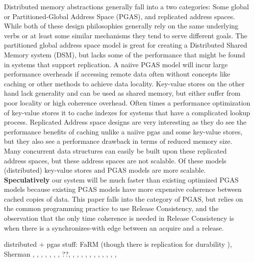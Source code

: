 \documentclass[sigplan,nonacm]{acmart}
\begin{document}
Distributed memory abstractions generally fall into a two categories:
Some global or Partitioned-Global Address Space (PGAS), and replicated address spaces. While both of these design philosophies 
generally rely on the same underlying verbs or at least some similar mechanisms they tend to 
serve different goals. The partitioned global address space model is great for creating a Distributed 
Shared Memory system (DSM), but lacks some of the performance that might be found in systems that support replication. 
A naiive PGAS model will incur large performance overheads if accessing remote data often
without concepts like caching or other methods to achieve data locality. Key-value stores on the other hand lack generality and can be used as shared memory, but 
either suffer from poor locality or high coherence overhead. Often times a performance optimization of key-value stores it to cache indexes for 
systems that have a complicated lookup process. Replicated Address space designs are very interesting as they do see the performance 
benefits of caching unlike a naiive pgas and some key-value stores, but they also see a performance drawback in terms of 
reduced memory size. Many concurrent data structures can easily be built upon these replicated address spaces, but these address 
spaces are not scalable. Of these models (distributed) key-value stores and PGAS models are more scalable. \textbf{Speculatively} our 
system will be much faster than existing optimized PGAS models because existing PGAS models have more expensive coherence 
between cached copies of data. This paper falls into the category of PGAS, but relies on the common programming practice 
to use Release Consistency, and the observation that the only time coherence is needed in Release Consistency 
is when there is a synchronizes-with edge between an acquire and a release.

distributed + pgas stuff:
FaRM (though there is replication for durability \cite{Dragojevic-NSDI-2014}), Sherman \cite{Wang-SIGMOD-2022},
\cite{Kalia-SIGCOMM-2014}, \cite{Mitchell-ATC-2013}, \cite{Devarajan-CLUSTER-2020}, \cite{Brock-ICPP-2019},
\cite{Lu-ACMtrans-2024}, \cite{Li-FAST-2023}, \cite{Han-SYSTOR-2023}??, \cite{Qiao-IEEEtrans-2024},
\cite{Hou-DSIT-2024}, \cite{Xiong-ICDCS-2023}, \cite{Duan-ICDCS-2021}, \cite{Cai-VLDB-2018}, 
\cite{Hong-JCST-2019}, \cite{Amza-Usenix-1994}, \cite{Tsai-SOSP-2017}, \cite{Endo-IPDRM-2020}, 
\cite{Kaxiras-HPDC-2015}, \cite{Jia-ACO-2022}, \cite{Farreras-IPDPS-2009}
\end{document}

